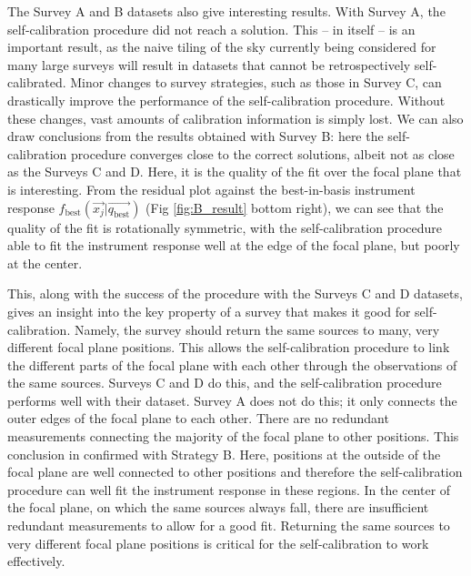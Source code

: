 \documentclass[manuscript]{aastex}
\newcommand{\basis}{\text{best}}
\begin{document}
The Survey A and B datasets also give interesting results. With Survey A, the self-calibration procedure did not reach a solution. This -- in itself -- is an important result, as the naive tiling of the sky currently being considered for many large surveys will result in datasets that cannot be retrospectively self-calibrated. Minor changes to survey strategies, such as those in Survey C, can drastically improve the performance of the self-calibration procedure. Without these changes, vast amounts of calibration information is simply lost. We can also draw conclusions from the results obtained with Survey B: here the self-calibration procedure converges close to the correct solutions, albeit not as close as the Surveys C and D. Here, it is the quality of the fit over the focal plane that is interesting. From the residual plot against the best-in-basis instrument response $f_\basis(\vec{x_j} | \vec{q_\basis})$ (Fig \ref{fig:B_result} bottom right), we can see that the quality of the fit is rotationally symmetric, with the self-calibration procedure able to fit the instrument response well at the edge of the focal plane, but poorly at the center. 

This, along with the success of the procedure with the Surveys C and D datasets, gives an insight into the key property of a survey that makes it good for self-calibration. Namely, the survey should return the same sources to many, very different focal plane positions. This allows the self-calibration procedure to link the different parts of the focal plane with each other through the observations of the same sources. Surveys C and D do this, and the self-calibration procedure performs well with their dataset. Survey A does not do this; it only connects the outer edges of the focal plane to each other. There are no redundant measurements connecting the majority of the focal plane to other positions. This conclusion in confirmed with Strategy B. Here, positions at the outside of the focal plane are well connected to other positions and therefore the self-calibration procedure can well fit the instrument response in these regions. In the center of the focal plane, on which the same sources always fall, there are insufficient redundant measurements to allow for a good fit. Returning the same sources to very different focal plane positions is critical for the self-calibration to work effectively. 
\end{document}
